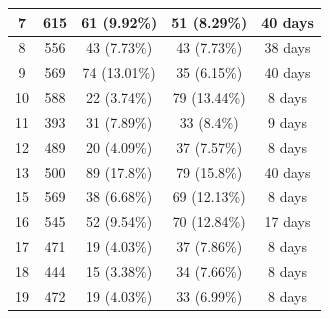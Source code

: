 \begin{table}[H]
\begin{adjustwidth}{-3.0cm}{-3.0cm}
\begin{tabular}{ccccc}
                        7                         & 615                         & 61 (9.92\%)                  & 51 (8.29\%)                     & 40 days                 \\ \midrule
                        8                         & 556                         & 43 (7.73\%)                  & 43 (7.73\%)                     & 38 days                 \\ \midrule
                        9                         & 569                         & 74 (13.01\%)                 & 35 (6.15\%)                     & 40 days                 \\ \midrule
                        10                        & 588                         & 22 (3.74\%)                  & 79 (13.44\%)                    & 8 days                  \\ \midrule
                        11                        & 393                         & 31 (7.89\%)                  & 33 (8.4\%)                      & 9 days                  \\ \midrule
                        12                        & 489                         & 20 (4.09\%)                  & 37 (7.57\%)                     & 8 days                  \\ \midrule
                        13                        & 500                         & 89 (17.8\%)                  & 79 (15.8\%)                     & 40 days                 \\ \midrule
                        15                        & 569                         & 38 (6.68\%)                  & 69 (12.13\%)                    & 8 days                  \\ \midrule
                        16                        & 545                         & 52 (9.54\%)                  & 70 (12.84\%)                    & 17 days                 \\ \midrule
                        17                        & 471                         & 19 (4.03\%)                  & 37 (7.86\%)                     & 8 days                  \\ \midrule
                        18                        & 444                         & 15 (3.38\%)                  & 34 (7.66\%)                     & 8 days                  \\ \midrule
                        19                        & 472                         & 19 (4.03\%)                  & 33 (6.99\%)                     & 8 days                  \\ \midrule

\end{tabular}
\end{adjustwidth}
\end{table}
